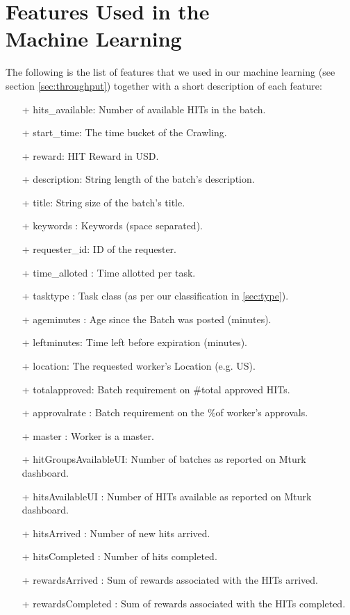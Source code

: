 \appendix
\label{ap:feats}
\section{Features Used in the \\ Machine Learning}
The following is the list of features that we used in our machine learning (see section \ref{sec:throughput}) together with a short description of each feature:
\begin{itemize}[noitemsep,topsep=0pt,parsep=0pt,partopsep=0pt]
\item[+] hits\_available:  Number of available HITs in the batch.
\item[+] start\_time:  The time bucket of the Crawling.
\item[+] reward: HIT Reward in USD.
\item[+] description:  String length of the batch's description.
\item[+] title: String size of the batch's title.
\item[+] keywords : Keywords (space separated).
\item[+] requester\_id:   ID of the requester.
\item[+] time\_alloted : Time allotted per task.
\item[+] tasktype : Task class (as per our classification in \ref{sec:type}).
\item[+] ageminutes : Age since the Batch was posted (minutes).
\item[+] leftminutes: Time left before expiration (minutes).
\item[+] location: The requested worker's Location (e.g. US).
\item[+] totalapproved: Batch requirement on \#total approved HITs.
\item[+] approvalrate : Batch requirement on the \%of worker's approvals.
\item[+] master : Worker is a master.
\item[+] hitGroupsAvailableUI: Number of batches as reported on Mturk dashboard.
\item[+] hitsAvailableUI : Number of HITs available as reported on Mturk dashboard.
\item[+] hitsArrived : Number of new hits arrived.
\item[+] hitsCompleted : Number of hits completed.
\item[+] rewardsArrived : Sum of rewards associated with the HITs arrived.
\item[+] rewardsCompleted : Sum of rewards associated with the HITs completed.

\end{itemize}

